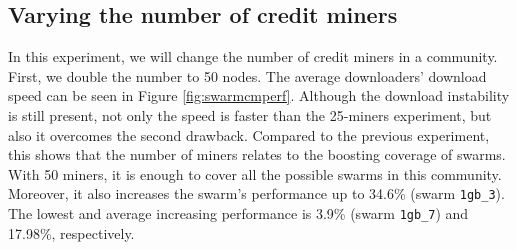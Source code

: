 \subsection{Varying the number of credit miners}
In this experiment, we will change the number of credit miners in a community. First, we double the number to 50 nodes. The average downloaders' download speed can be seen in Figure \ref{fig:swarmcmperf}. Although the download instability is still present, not only the speed is faster than the 25-miners experiment, but also it overcomes the second drawback. Compared to the previous experiment, this shows that the number of miners relates to the boosting coverage of swarms. With 50 miners, it is enough to cover all the possible swarms in this community. Moreover, it also increases the swarm's performance up to 34.6\% (swarm \texttt{1gb\_3}). The lowest and average increasing performance is 3.9\% (swarm \texttt{1gb\_7}) and 17.98\%, respectively.


